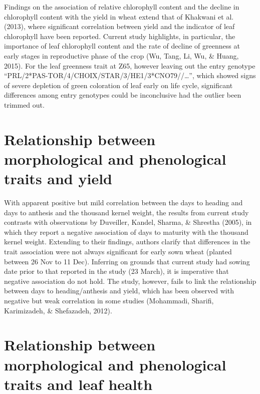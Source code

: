 \documentclass[12pt,oneside]{dukestatscithesis} %
\begin{document}
Findings on the association of relative chlorophyll content and the decline in chlorophyll content with the yield in wheat extend that of Khakwani et al. (2013), where significant correlation between yield and the indicator of leaf chlorophyll have been reported. Current study highlights, in particular, the importance of leaf chlorophyll content and the rate of decline of greenness at early stages in reproductive phase of the crop (Wu, Tang, Li, Wu, \& Huang, 2015). For the leaf greenness trait at Z65, however leaving out the entry genotype ``PRL/2*PAS-TOR/4/CHOIX/STAR/3/HE1/3*CNO79//\ldots{}'', which showed signs of severe depletion of green coloration of leaf early on life cycle, significant differences among entry genotypes could be inconclusive had the outlier been trimmed out.

\hypertarget{relationship-between-morphological-and-phenological-traits-and-yield}{%
\section{Relationship between morphological and phenological traits and yield}\label{relationship-between-morphological-and-phenological-traits-and-yield}}

With apparent positive but mild correlation between the days to heading and days to anthesis and the thousand kernel weight, the results from current study contrasts with observations by Duveiller, Kandel, Sharma, \& Shrestha (2005), in which they report a negative association of days to maturity with the thousand kernel weight. Extending to their findings, authors clarify that differences in the trait association were not always significant for early sown wheat (planted between 26 Nov to 11 Dec). Inferring on grounds that current study had sowing date prior to that reported in the study (23 March), it is imperative that negative association do not hold. The study, however, fails to link the relationship between days to heading/anthesis and yield, which has been observed with negative but weak correlation in some studies (Mohammadi, Sharifi, Karimizadeh, \& Shefazadeh, 2012).

\hypertarget{relationship-between-morphological-and-phenological-traits-and-leaf-health}{%
\section{Relationship between morphological and phenological traits and leaf health}\label{relationship-between-morphological-and-phenological-traits-and-leaf-health}}
\end{document}
